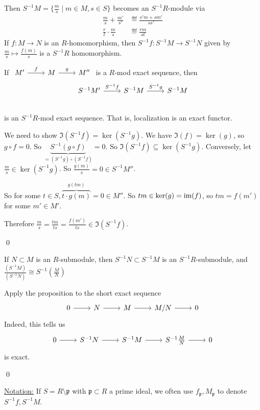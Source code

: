 \documentclass[x11names,reqno,14pt]{extarticle}
\newcommand{\mk}[1]{\mathfrak{#1}}
\begin{document}
Then $S^{-1}M = \{\frac{m}{s} \mid m \in M, s \in S\}$ becomes an $S^{-1}R$-module via
\begin{align*}
\frac{m}{s} + \frac{m'}{s'} & \eqdef \frac{s'm + sm'}{ss'}
\\
\frac{r}{t}\cdot\frac{m}{s} & \eqdef \frac{rm}{st}
\end{align*}
If $f:M\to N$ is an $R$-homomorphism, then $S^{-1}f:S^{-1}M\to S^{-1}N$ given by $\frac{m}{s}\mapsto\frac{f(m)}{s}$ is a $S^{-1}R$ homomorphism. 

\prop

If $\begin{tikzcd}M'\ar[r, "f"]&M\ar[r, "g"]&M'' \end{tikzcd}$ is a $R$-mod exact sequence, then 
\[
\begin{tikzcd} S^{-1}M' \ar[r, "S^{-1}f"] & S^{-1}M\ar[r, "S^{-1}g"] & S^{-1}M \\ \end{tikzcd}
\]
is an $S^{-1}R$-mod exact sequence. That is, localization is an exact functor.

\proof

We need to show $\Im(S^{-1}f) = \ker(S^{-1}g)$. We have $\Im(f) = \ker(g)$, so $g \circ f =0 $. So $\underbrace{S^{-1}(g\circ f)}_{=(S^{-1}g)\circ(S^{-1}f)} = 0$. So $\Im(S^{-1}f) \subseteq \ker(S^{-1}g)$. Conversely, let $\frac{m}{s}\in\ker(S^{-1}g)$. So $\frac{g(m)}{s} = 0 \in S^{-1}M''$. 

So for some $t \in S, \overbrace{t\cdot g(m)}^{g(tm)} =0 \in M''$. So $tm \in \ker(g) = \operatorname{\mathrm{im}}(f)$, so $tm = f(m')$ for some $m' \in M'$. 

Therefore $\frac{m}{s} = \frac{tm}{ts} = \frac{f(m')}{ts}\in\Im(S^{-1}f)$.

\qed

\cor 

If $N\subset M$ is an $R$-submodule, then $S^{-1}N\subset S^{-1}M$ is an $S^{-1}R$-submodule, and $\frac{(S^{-1}M)}{(S^{-1}N)} \cong S^{-1}(\frac{M}{N})$

\proof

Apply the proposition to the short exact sequence
\[
\exactshort{N}{}{M}{}{M/N}
\]
Indeed, this tells us 
\[
\exactshort{S^{-1}N}{}{S^{-1}M}{}{S^{-1}\frac{M}{N}}
\]
is exact.

\qed

\underline{Notation:} If $S = R\setminus\mk{p}$ with $\mk{p}\subset R$ a prime ideal, we often use $f_{\mk{p}}, M_{\mk{p}}$ to denote $S^{-1}f, S^{-1}M$. 

\prop
\end{document}
